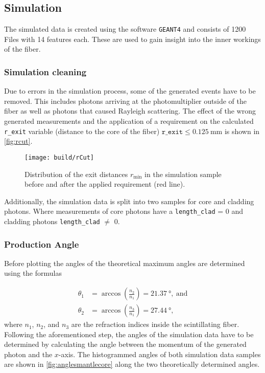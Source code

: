 \subsection{Simulation}

The simulated data is created using the software \texttt{GEANT4} and consists of 1200 Files with 14 features each. 
These are used to gain insight into the inner workings of the fiber. 
\subsubsection{Simulation cleaning}
Due to errors in the simulation process, some of the generated events have to be removed. 
This includes photons arriving at the photomultiplier outside of the fiber as well as photons that caused Rayleigh scattering. 
The effect of the wrong generated measurements and the application of a requirement on the calculated \texttt{r\_exit} variable 
(distance to the core of the fiber) $\mathtt{r\_exit}\leq \qty{0.125}{\milli\meter}$ is shown in \autoref{fig:rcut}.

\begin{figure}
	\centering
	\texttt{[image: build/rCut]}
	\caption{Distribution of the exit distances $r_\mathrm{min}$ in the simulation sample before and after the applied requirement (red line).}
	\label{fig:rcut}
\end{figure}

Additionally, the simulation data is split into two samples for core and cladding photons. Where measurements of core photons have a \texttt{length\_clad} = 0 and cladding photons \texttt{length\_clad} $\neq$ 0.

\subsubsection{Production Angle}
Before plotting the angles of the theoretical maximum angles are determined using the formulas

\begin{align*}
	\theta_1 &= \arccos\left(\frac{n_2}{n_1}\right) = \qty{21.37}{\degree},\ \mathrm{and}\\
	\theta_2 &= \arccos\left(\frac{n_3}{n_1}\right) = \qty{27.44}{\degree},
\end{align*}
where $n_1$, $n_2$, and $n_3$ are the refraction indices inside the scintillating fiber.
Following the aforementioned step, the angles of the simulation data have to be determined by 
calculating the angle between the momentum of the generated photon and the $x$-axis. 
The histogrammed angles of both simulation data samples are shown in \autoref{fig:anglesmantlecore} along the two theoretically determined angles.


